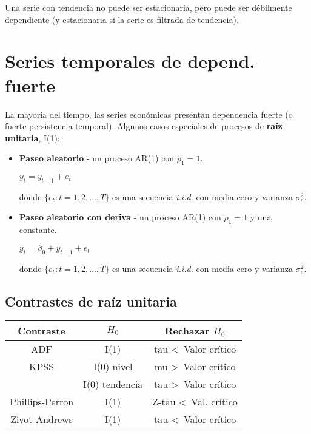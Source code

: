 \documentclass[10pt, a4paper, landscape]{extarticle}
\begin{document}
\begin{multicols}{3}
Una serie con tendencia no puede ser estacionaria, pero puede ser débilmente dependiente (y estacionaria si la serie es filtrada de tendencia).

\columnbreak

\section*{Series temporales de depend. fuerte}

La mayoría del tiempo, las series económicas presentan dependencia fuerte (o fuerte persistencia temporal). Algunos casos especiales de procesos de \textbf{raíz unitaria}, I(1):

\begin{itemize}[leftmargin=*]
		\item \textbf{Paseo aleatorio} - un proceso AR(1) con $\rho_1 = 1$.
	\begin{center}
		$y_t = y_{t - 1} + e_t$
	\end{center}
	donde $\lbrace e_t : t = 1, 2, \ldots, T \rbrace$ es una secuencia \textsl{i.i.d.} con media cero y varianza $\sigma^2_e$.
	
	\item \textbf{Paseo aleatorio con deriva} - un proceso AR(1) con $\rho_1 = 1$ y una constante.
	\begin{center}
		$y_t = \beta_0 + y_{t - 1} + e_t$
	\end{center}
	donde $\lbrace e_t : t = 1, 2, \ldots, T \rbrace$ es una secuencia \textsl{i.i.d.} con media cero y varianza $\sigma^2_e$.
\end{itemize}

\subsection*{Contrastes de raíz unitaria}

\begin{center}
	\begin{tabular}{ c | c | c }
		Contraste       & $H_0$          & Rechazar $H_0$                    \\ \hline
		ADF             & I(1)           & tau \textless \, Valor crítico    \\ \hline
		KPSS            & I(0) nivel     & mu \textgreater \, Valor crítico  \\
		                & I(0) tendencia & tau \textgreater \, Valor crítico \\ \hline
		Phillips-Perron & I(1)           & Z-tau \textless \, Val. crítico   \\ \hline
		Zivot-Andrews   & I(1)           & tau \textless \, Valor crítico
	\end{tabular}
\end{center}


\end{multicols}
\end{document}
